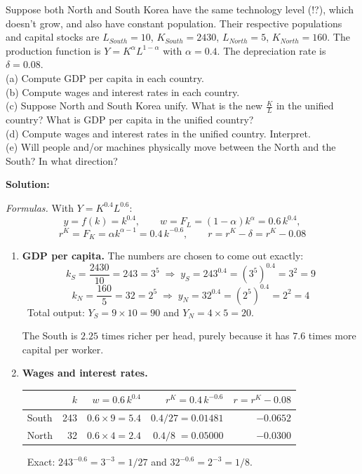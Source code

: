 \documentclass[12pt, letterpaper]{article}
\begin{document}
\begin{tcolorbox}[oddbox,title={Problem 4.3 \quad Korean Unification}]
\begin{tcolorbox}[questionbox]
Suppose both North and South Korea have the same technology level (!?), which doesn't grow,
and also have constant population. Their respective populations and capital stocks are
$L_{South} = 10$, $K_{South} = 2430$, $L_{North} = 5$, $K_{North} = 160$. The production
function is $Y = K^{\alpha}L^{1-\alpha}$ with $\alpha = 0.4$. The depreciation rate is
$\delta = 0.08$.\\[3pt]
(a) Compute GDP per capita in each country.\\
(b) Compute wages and interest rates in each country.\\
(c) Suppose North and South Korea unify. What is the new $\frac{K}{L}$ in the unified
country? What is GDP per capita in the unified country?\\
(d) Compute wages and interest rates in the unified country. Interpret.\\
(e) Will people and/or machines physically move between the North and the South? In what
direction?
\end{tcolorbox}

\textbf{Solution:}

\emph{Formulas.} With $Y = K^{0.4}L^{0.6}$:
$$y = f(k) = k^{0.4}, \qquad w = F_L = (1-\alpha)k^{\alpha} = 0.6\,k^{0.4},$$
$$r^K = F_K = \alpha k^{\alpha-1} = 0.4\,k^{-0.6}, \qquad r = r^K - \delta = r^K - 0.08$$

\begin{enumerate}

\item \textbf{GDP per capita.} The numbers are chosen to come out exactly:
$$k_S = \frac{2430}{10} = 243 = 3^5 \;\Longrightarrow\; y_S = 243^{0.4} = (3^5)^{0.4} = 3^2
= \boxed{9}$$
$$k_N = \frac{160}{5} = 32 = 2^5 \;\Longrightarrow\; y_N = 32^{0.4} = (2^5)^{0.4} = 2^2
= \boxed{4}$$
\checkmark\ Total output: $Y_S = 9 \times 10 = 90$ and $Y_N = 4 \times 5 = 20$.

The South is $2.25$ times richer per head, purely because it has $7.6$ times more capital per
worker.

\item \textbf{Wages and interest rates.}

\begin{center}
\begin{tabular}{lrrrr}
\toprule
& $k$ & $w = 0.6\,k^{0.4}$ & $r^K = 0.4\,k^{-0.6}$ & $r = r^K - 0.08$ \\
\midrule
South & 243 & $0.6 \times 9 = \mathbf{5.4}$ & $0.4/27 = \mathbf{0.01481}$ & $\mathbf{-0.0652}$ \\
North & 32  & $0.6 \times 4 = \mathbf{2.4}$ & $0.4/8 \;= \mathbf{0.05000}$ & $\mathbf{-0.0300}$ \\
\bottomrule
\end{tabular}
\end{center}
\checkmark\ Exact: $243^{-0.6} = 3^{-3} = 1/27$ and $32^{-0.6} = 2^{-3} = 1/8$.


\end{enumerate}
\end{tcolorbox}
\end{document}
